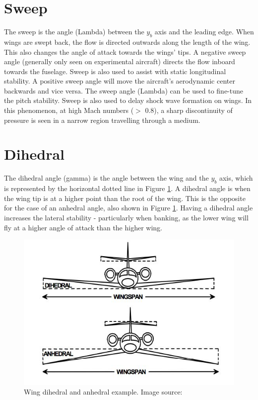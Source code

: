 \section{Sweep}
The sweep is the angle (\acrshort{Lambda}) between the $y_b$ axis and the leading edge. When wings are swept back, the flow is directed outwards along the length of the wing. This also changes the angle of attack towards the wings' tips. A negative sweep angle (generally only seen on experimental aircraft) directs the flow inboard towards the fuselage. Sweep is also used to assist with static longitudinal stability. A positive sweep angle will move the aircraft's aerodynamic center backwards and vice versa. The sweep angle (\acrshort{Lambda}) can be used to fine-tune the pitch stability. Sweep is also used to delay shock wave formation on wings. In this phenomenon, at high Mach numbers ($>$ 0.8), a sharp discontinuity of pressure is seen in a narrow region travelling through a medium. 



\section{Dihedral}
The dihedral angle (\acrshort{gamma}) is the angle between the wing and the $y_b$ axis, which is represented by the horizontal dotted line in Figure \ref{fig:dihedral}. A dihedral angle is when the wing tip is at a higher point than the root of the wing. This is the opposite for the case of an anhedral angle, also shown in Figure \ref{fig:dihedral}. Having a dihedral angle increases the lateral stability - particularly when banking, as the lower wing will fly at a higher angle of attack than the higher wing. 

\begin{figure}[H]
  \centering
   \includegraphics[width=1\linewidth]{03_LiteratureReview/Figs/dihedral.jpg}
  \caption{Wing dihedral and anhedral example. Image source: \cite{moreplane}}
  \label{fig:dihedral}
\end{figure}

